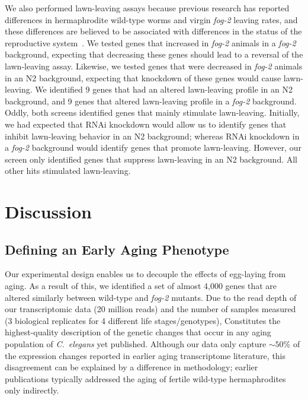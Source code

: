 \documentclass[10pt,letterpaper,twocolumn]{article}
\newcommand{\cel}{\emph{C.~elegans}}
\newcommand{\fog}{\emph{fog-2}}
\begin{document}
We also performed lawn-leaving assays because previous research has reported differences in hermaphrodite wild-type worms and virgin \fog{} leaving rates, and these differences are believed to be associated with differences in the status of the reproductive system~\cite{Lipton2004}. We tested genes that increased in \fog{} animals in a \fog{} background, expecting that decreasing these genes should lead to a reversal of the lawn-leaving assay. Likewise, we tested genes that were decreased in \fog{} animals in an N2 background, expecting that knockdown of these genes would cause lawn-leaving.
We identified 9 genes that had an altered lawn-leaving profile in an N2 background, and 9 genes that altered lawn-leaving profile in a \fog{} background. Oddly, both screens identified  genes that mainly stimulate lawn-leaving. Initially, we had expected that RNAi knockdown would allow us to identify genes that inhibit lawn-leaving behavior in an N2 background; whereas RNAi knockdown in a \fog{} background would identify genes that promote lawn-leaving. However, our screen only identified genes that suppress lawn-leaving in an N2 background. All other hits stimulated lawn-leaving.



\section*{Discussion}
\label{sec:discussion}

\subsection*{Defining an Early Aging Phenotype}
\label{sub:Defining an Early Aging Phenotype}

Our experimental design enables us to decouple the effects of egg-laying from aging. As a result of this, we identified a set of almost 4,000 genes that are altered similarly between wild-type and \fog{} mutants. Due to the read depth of our transcriptomic data (20 million reads) and the number of samples measured (3 biological replicates for 4 different life stages/genotypes), Constitutes the highest-quality description of the genetic changes that occur in any aging population of \cel{} yet published.
Although our data only capture $\sim50\%$ of the expression changes reported in earlier aging transcriptome literature, this disagreement can be explained by a difference in methodology; earlier publications typically addressed the aging of fertile wild-type hermaphrodites only indirectly.
\end{document}
